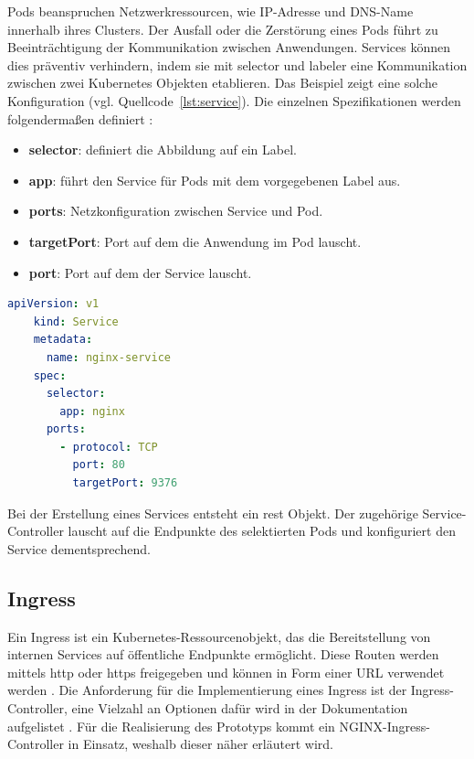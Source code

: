 Pods beanspruchen Netzwerkressourcen, wie IP-Adresse und DNS-Name 
innerhalb ihres Clusters. Der Ausfall oder die Zerstörung eines Pods führt zu Beeinträchtigung der Kommunikation
zwischen Anwendungen. Services können dies präventiv verhindern, indem sie mit
selector und labeler eine Kommunikation zwischen zwei Kubernetes Objekten etablieren.
Das Beispiel zeigt eine solche Konfiguration (vgl. Quellcode~\ref{lst:service}). 
Die einzelnen Spezifikationen werden folgendermaßen definiert \cite{kubernetesservice}:

\begin{itemize}
  \item \textbf{selector}: definiert die Abbildung auf ein Label.
  \item \textbf{app}: führt den Service für Pods mit dem vorgegebenen Label aus.
  \item \textbf{ports}: Netzkonfiguration zwischen Service und Pod.
  \item \textbf{targetPort}: Port auf dem die Anwendung im Pod lauscht.
  \item \textbf{port}: Port auf dem der Service lauscht.
\end{itemize}

\begin{lstlisting}[caption={service.yaml \cite{kubernetesservice} },captionpos=b,label={lst:service},language=yaml]
    apiVersion: v1
    kind: Service
    metadata:
      name: nginx-service
    spec:
      selector:
        app: nginx
      ports:
        - protocol: TCP
          port: 80
          targetPort: 9376
    \end{lstlisting}


Bei der Erstellung eines Services entsteht ein \acs{rest} Objekt. 
Der zugehörige Service-Controller lauscht auf die Endpunkte des selektierten Pods und konfiguriert den Service dementsprechend. 


\subsection{Ingress}

Ein Ingress ist ein Kubernetes-Ressourcenobjekt, das die Bereitstellung von internen Services auf öffentliche Endpunkte ermöglicht.
Diese Routen werden mittels \acs{http} oder \acs{https} freigegeben und können in Form einer URL verwendet werden \cite{kubernetesingress}.
Die Anforderung für die Implementierung eines Ingress ist der Ingress-Controller, eine Vielzahl an Optionen dafür wird in der 
Dokumentation aufgelistet \cite{kubernetesingresscontroller}. Für die Realisierung des Prototyps kommt ein NGINX-Ingress-Controller in Einsatz, weshalb
dieser näher erläutert wird.


